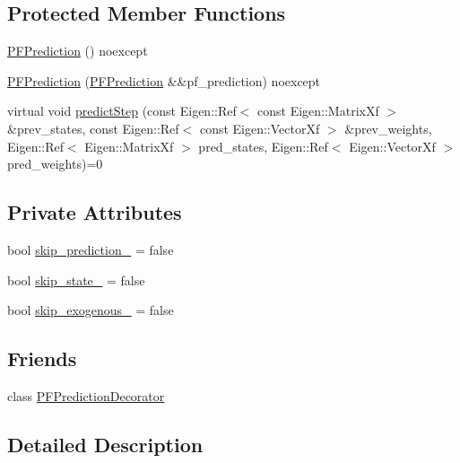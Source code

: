 \subsection*{Protected Member Functions}
\begin{DoxyCompactItemize}
\item 
\mbox{\hyperlink{classbfl_1_1PFPrediction_a27c90e025bf5376cedd5dfc9657fb1b9}{P\+F\+Prediction}} () noexcept
\item 
\mbox{\hyperlink{classbfl_1_1PFPrediction_a3a8645cb4fe088e7a3a2dc1e64aaca35}{P\+F\+Prediction}} (\mbox{\hyperlink{classbfl_1_1PFPrediction}{P\+F\+Prediction}} \&\&pf\+\_\+prediction) noexcept
\item 
virtual void \mbox{\hyperlink{classbfl_1_1PFPrediction_a2488a3f3bf2345b4723d96cd7fda5491}{predict\+Step}} (const Eigen\+::\+Ref$<$ const Eigen\+::\+Matrix\+Xf $>$ \&prev\+\_\+states, const Eigen\+::\+Ref$<$ const Eigen\+::\+Vector\+Xf $>$ \&prev\+\_\+weights, Eigen\+::\+Ref$<$ Eigen\+::\+Matrix\+Xf $>$ pred\+\_\+states, Eigen\+::\+Ref$<$ Eigen\+::\+Vector\+Xf $>$ pred\+\_\+weights)=0
\end{DoxyCompactItemize}
\subsection*{Private Attributes}
\begin{DoxyCompactItemize}
\item 
bool \mbox{\hyperlink{classbfl_1_1PFPrediction_aec4b8a747bed1b38150bc2b1c21fb66d}{skip\+\_\+prediction\+\_\+}} = false
\item 
bool \mbox{\hyperlink{classbfl_1_1PFPrediction_ac094202f89c8190257715b665f2c07ca}{skip\+\_\+state\+\_\+}} = false
\item 
bool \mbox{\hyperlink{classbfl_1_1PFPrediction_a10c2de12cbd94e2051fc82a42d57aaaf}{skip\+\_\+exogenous\+\_\+}} = false
\end{DoxyCompactItemize}
\subsection*{Friends}
\begin{DoxyCompactItemize}
\item 
class \mbox{\hyperlink{classbfl_1_1PFPrediction_af2aa9540d676f442bcce073daa9974dd}{P\+F\+Prediction\+Decorator}}
\end{DoxyCompactItemize}


\subsection{Detailed Description}


